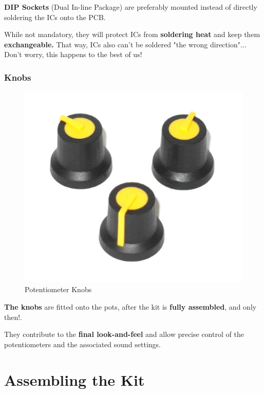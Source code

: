 \documentclass{scrartcl}
\begin{document}
\textbf{DIP Sockets} (Dual In-line Package) are preferably mounted instead of directly soldering the ICs onto the PCB.

While not mandatory, they will protect ICs from \textbf{soldering heat} and keep them \textbf{exchangeable.}
That way, ICs also can't be soldered "the wrong direction"... Don't worry, this happens to the best of us!

\subsubsection{Knobs}

\begin{figure}[!ht]
    \begin{center}
        \includegraphics[scale=0.20]{assets/zekit-knobs.jpg}
        \caption{Potentiometer Knobs}
    \end{center}
\end{figure}

\textbf{The knobs} are fitted onto the pots, after the kit is \textbf{fully assembled}, and only then!.

They contribute to the \textbf{final look-and-feel} and allow precise control of the potentiometers and the associated sound settings.

\pagebreak

\section{Assembling the Kit}
\end{document}
